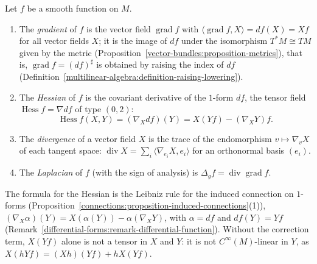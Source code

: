 \begin{definition}\label{riemannian-geometry:definition-gradient-hessian}
Let $f$ be a smooth function on $M$.
\begin{enumerate}
\item The \emph{gradient} of $f$ is the vector field $\operatorname{grad}f$ with $\langle\operatorname{grad}f, X\rangle = df(X) = Xf$ for all vector fields $X$; it is the image of $df$ under the isomorphism
$T^*M \cong TM$ given by the metric (Proposition~\ref{vector-bundles:proposition-metrics}), that is, $\operatorname{grad}f = (df)^\sharp$ is obtained by raising the index of $df$
(Definition~\ref{multilinear-algebra:definition-raising-lowering}).
\item The \emph{Hessian} of $f$ is the covariant derivative of the $1$-form $df$, the tensor field $\operatorname{Hess}f = \nabla df$ of type $(0,2)$:
\[
\operatorname{Hess}f(X, Y) = (\nabla_Xdf)(Y) = X(Yf) - (\nabla_XY)f .
\]
\item The \emph{divergence} of a vector field $X$ is the trace of the endomorphism $v \mapsto \nabla_vX$ of each tangent space: $\operatorname{div}X = \sum_i\langle\nabla_{e_i}X, e_i\rangle$ for an orthonormal
basis $(e_i)$.
\item The \emph{Laplacian} of $f$ (with the sign of analysis) is $\Delta_gf = \operatorname{div}\operatorname{grad}f$.
\end{enumerate}
\end{definition}

The formula for the Hessian is the Leibniz rule for the induced connection on $1$-forms (Proposition~\ref{connections:proposition-induced-connections}(1)), $(\nabla_X\alpha)(Y) = X(\alpha(Y)) - \alpha(\nabla_XY)$, with
$\alpha = df$ and $df(Y) = Yf$ (Remark~\ref{differential-forms:remark-differential-function}). Without the correction term, $X(Yf)$ alone is not a tensor in $X$ and $Y$: it is not $C^\infty(M)$-linear in $Y$, as
$X(hYf) = (Xh)(Yf) + hX(Yf)$.

